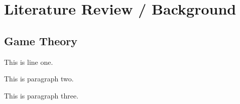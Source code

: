 \documentclass[11pt, a4paper]{article}
\title{\vspace{-7cm}}
\author{}
\date{}
\begin{document}
\maketitle

\section{Literature Review / Background}

\subsection{Game Theory}
This is line one. %

\noindent
This is paragraph two. %

\noindent
This is paragraph three.

\clearpage
\end{document}
